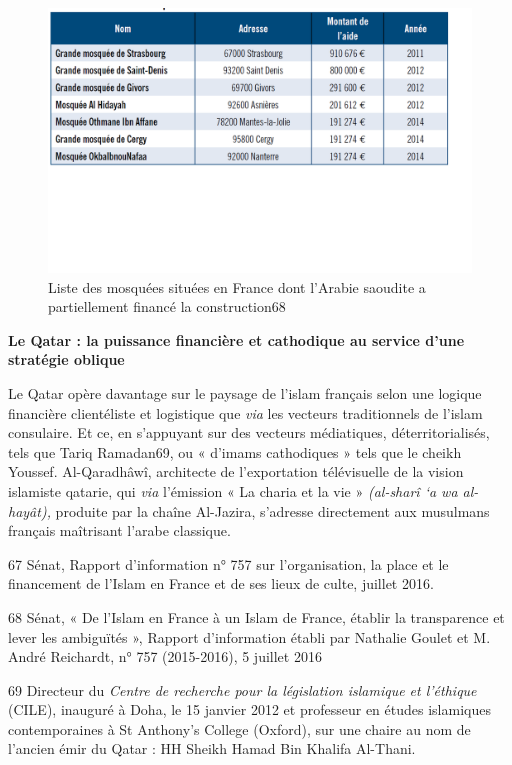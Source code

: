 \begin{figure}
    \centering
    \includegraphics[width=\textwidth]{ImageIslamFrance/MosqueeArabieSaoudite.png}
    \caption{Liste des mosquées situées en France dont l'Arabie saoudite a
partiellement financé la construction68}
    \label{fig:MosqueeArabieSaoudite}
\end{figure}

\textbf{Le Qatar : la puissance financière et cathodique au service
d'une stratégie oblique}

Le Qatar opère davantage sur le paysage de l'islam français selon une
logique financière clientéliste et logistique que \emph{via} les
vecteurs traditionnels de l'islam consulaire. Et ce, en s'appuyant sur
des vecteurs médiatiques, déterritorialisés, tels que Tariq Ramadan69,
ou « d'imams cathodiques » tels que le cheikh Youssef. Al-Qaradhâwî,
architecte de l'exportation télévisuelle de la vision islamiste qatarie,
qui \emph{via} l'émission « La charia et la vie » \emph{(al-sharî `a wa
al-hayât),} produite par la chaîne Al-Jazira, s'adresse directement aux
musulmans français maîtrisant l'arabe classique.

67 Sénat, Rapport d'information n° 757 sur l'organisation, la place et
le financement de l'Islam en France et de ses lieux de culte, juillet
2016.

68 Sénat, « De l'Islam en France à un Islam de France, établir la
transparence et lever les ambiguïtés », Rapport d'information établi par
Nathalie Goulet et M. André Reichardt, n° 757 (2015-2016), 5 juillet
2016

69 Directeur du \emph{Centre de recherche pour la législation islamique
et l'éthique} (CILE), inauguré à Doha, le 15 janvier 2012 et professeur
en études islamiques contemporaines à St Anthony's College (Oxford), sur
une chaire au nom de l'ancien émir du Qatar : HH Sheikh Hamad Bin
Khalifa Al-Thani.

